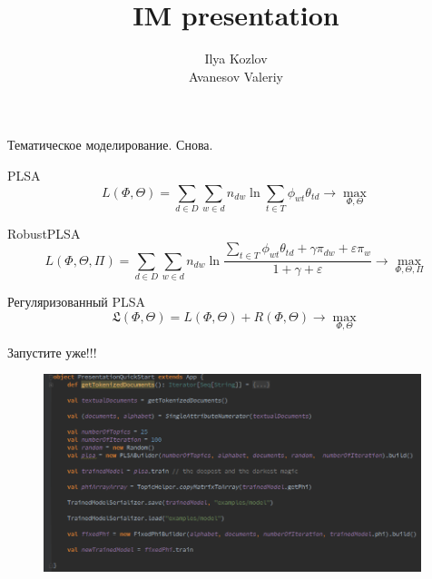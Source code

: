 \documentclass{beamer}
\begin{document}
\title{IM presentation}  
\author{Ilya Kozlov \\Avanesov Valeriy}




\frame{\titlepage} 

\begin{frame}{Тематическое моделирование. Снова. }
	
	
	\begin{block}{PLSA}
			$$L(\Phi, \Theta) = \sum\limits_{d \in D} \sum\limits_{w \in d} 
	n_{dw} \ln \sum\limits_{t \in T} \phi_{wt}\theta_{td} \rightarrow \max\limits_{\Phi, \Theta}$$
	\end{block}
	\begin{block}{RobustPLSA}
			$$L(\Phi, \Theta, \Pi) = \sum\limits_{d \in D} \sum\limits_{w \in d} 
	n_{dw} \ln \frac{ \sum_{t \in T} \phi_{wt}\theta_{td} + \gamma \pi_{dw} + \varepsilon \pi_w  }{1+\gamma+\varepsilon} \rightarrow \max\limits_{\Phi, \Theta, \Pi}$$	
	\end{block}
	
	\begin{block}{Регуляризованный PLSA}
		$$\mathfrak{L}(\Phi, \Theta) =  L(\Phi, \Theta) + R(\Phi, \Theta) \rightarrow \max\limits_{\Phi, \Theta} $$
	\end{block}
	
\end{frame}

\begin{frame}{Запустите уже!!!}
    \begin{figure}[ht!]
	\centering
	\includegraphics[width=110mm]{quckstart}
	\label{overflow}
    \end{figure}
\end{frame}
\end{document}
